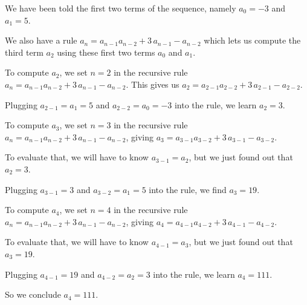 \documentclass{ximera}
\begin{document}
\begin{question}
    \begin{hint}
      We have been told the first two terms of the sequence, namely $a_0 = -3$ and $a_1 = 5$.
    \end{hint}
    \begin{hint}
      We also have a rule $a_n = {a_{n-1}} {a_{n-2}} + 3 \, {a_{n-1}} - {a_{n-2}}$ which lets us compute the third term $a_2$ using these first two terms $a_0$ and $a_1$.
    \end{hint}
    \begin{hint}
      To compute $a_2$, we set $n = 2$ in the recursive rule $a_n = {a_{n-1}} {a_{n-2}} + 3 \, {a_{n-1}} - {a_{n-2}}$.  This gives us $a_2 = {a_{2-1}} {a_{2-2}} + 3 \, {a_{2-1}} - {a_{2-2}}$.
    \end{hint}
    \begin{hint}
      Plugging $a_{2-1} = a_{1} = 5$ and $a_{2-2} = a_{0} = -3$ into the rule, we learn $a_2 = 3$.
    \end{hint}
    \begin{hint}
      To compute $a_3$, we set $n = 3$ in the recursive rule $a_n = {a_{n-1}} {a_{n-2}} + 3 \, {a_{n-1}} - {a_{n-2}}$, giving $a_3 = {a_{3-1}} {a_{3-2}} + 3 \, {a_{3-1}} - {a_{3-2}}$.
    \end{hint}
    \begin{hint}
      To evaluate that, we will have to know $a_{3-1} = a_{2}$, but we just found out that $a_{2} = 3$.
    \end{hint}
    \begin{hint}
      Plugging $a_{3-1} = 3$ and $a_{3-2} = a_{1} = 5$ into the rule, we find $a_3 = 19$.
    \end{hint}
    \begin{hint}
      To compute $a_4$, we set $n = 4$ in the recursive rule $a_n = {a_{n-1}} {a_{n-2}} + 3 \, {a_{n-1}} - {a_{n-2}}$, giving $a_4 = {a_{4-1}} {a_{4-2}} + 3 \, {a_{4-1}} - {a_{4-2}}$.
    \end{hint}
    \begin{hint}
      To evaluate that, we will have to know $a_{4-1} = a_{3}$, but we just found out that $a_{3} = 19$.
    \end{hint}
    \begin{hint}
      Plugging $a_{4-1} = 19$ and $a_{4-2} = a_{2} = 3$ into the rule, we learn $a_4 = 111$.
    \end{hint}
    \begin{hint}
      So we conclude $a_4 = 111$.
    \end{hint}

    \begin{multipleChoice}
    \end{multipleChoice}

\end{question}
\end{document}
